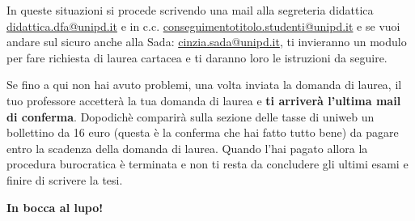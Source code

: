 \documentclass[12pt]{article}
\begin{document}
{\par{}\relax
In queste situazioni si procede scrivendo una mail alla segreteria didattica \href{mailto:didattica.dfa@unipd.it}{didattica.dfa@unipd.it} e in c.c. \href{mailto:conseguimentotitolo.studenti@unipd.it}{conseguimentotitolo.studenti@unipd.it} e se vuoi andare sul sicuro anche alla Sada: \href{mailto:cinzia.sada@unipd.it}{cinzia.sada@unipd.it}, ti invieranno un modulo per fare richiesta di laurea cartacea e ti daranno loro le istruzioni da seguire.
\par}


\vspace{2cm}
Se fino a qui non hai avuto problemi, una volta inviata la domanda di laurea, il tuo professore accetterà la tua domanda di laurea e \textbf{ti arriverà l'ultima mail di conferma}. Dopodichè comparirà sulla sezione delle tasse di uniweb un bollettino da 16 euro (questa è la conferma che hai fatto tutto bene) da pagare entro la scadenza della domanda di laurea. Quando l'hai pagato allora la procedura burocratica è terminata e non ti resta da concludere gli ultimi esami e finire di scrivere la tesi. 

\bigskip
\hspace{\fill}\textbf{In bocca al lupo!}\hspace{\fill}
\end{document}
